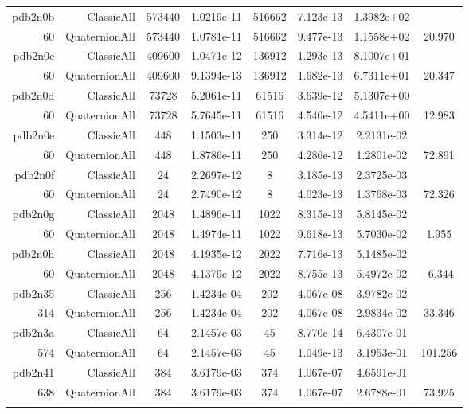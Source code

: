 \begin{xltabular}{\textwidth}{r|rcS[table-format=1.4e+2]cS[table-format=1.3e+2]S[table-format=1.4e+2]S[table-format=-1.3]}
pdb2n0b & ClassicAll & 573440 & 1.0219e-11 & 516662 & 7.123e-13 & 1.3982e+02 & \\
60 & QuaternionAll & 573440 & 1.0781e-11 & 516662 & 9.477e-13 & 1.1558e+02 & 20.970\\  \addlinespace
pdb2n0c & ClassicAll & 409600 & 1.0471e-12 & 136912 & 1.293e-13 & 8.1007e+01 & \\
60 & QuaternionAll & 409600 & 9.1394e-13 & 136912 & 1.682e-13 & 6.7311e+01 & 20.347\\  \addlinespace
pdb2n0d & ClassicAll & 73728 & 5.2061e-11 & 61516 & 3.639e-12 & 5.1307e+00 & \\
60 & QuaternionAll & 73728 & 5.7645e-11 & 61516 & 4.540e-12 & 4.5411e+00 & 12.983\\  \addlinespace
pdb2n0e & ClassicAll & 448 & 1.1503e-11 & 250 & 3.314e-12 & 2.2131e-02 & \\
60 & QuaternionAll & 448 & 1.8786e-11 & 250 & 4.286e-12 & 1.2801e-02 & 72.891\\  \addlinespace
pdb2n0f & ClassicAll & 24 & 2.2697e-12 & 8 & 3.185e-13 & 2.3725e-03 & \\
60 & QuaternionAll & 24 & 2.7490e-12 & 8 & 4.023e-13 & 1.3768e-03 & 72.326\\  \addlinespace
pdb2n0g & ClassicAll & 2048 & 1.4896e-11 & 1022 & 8.315e-13 & 5.8145e-02 & \\
60 & QuaternionAll & 2048 & 1.4974e-11 & 1022 & 9.618e-13 & 5.7030e-02 & 1.955\\  \addlinespace
pdb2n0h & ClassicAll & 2048 & 4.1935e-12 & 2022 & 7.716e-13 & 5.1485e-02 & \\
60 & QuaternionAll & 2048 & 4.1379e-12 & 2022 & 8.755e-13 & 5.4972e-02 & -6.344\\  \addlinespace
pdb2n35 & ClassicAll & 256 & 1.4234e-04 & 202 & 4.067e-08 & 3.9782e-02 & \\
314 & QuaternionAll & 256 & 1.4234e-04 & 202 & 4.067e-08 & 2.9834e-02 & 33.346\\  \addlinespace
pdb2n3a & ClassicAll & 64 & 2.1457e-03 & 45 & 8.770e-14 & 6.4307e-01 & \\
574 & QuaternionAll & 64 & 2.1457e-03 & 45 & 1.049e-13 & 3.1953e-01 & 101.256\\  \addlinespace
pdb2n41 & ClassicAll & 384 & 3.6179e-03 & 374 & 1.067e-07 & 4.6591e-01 & \\
638 & QuaternionAll & 384 & 3.6179e-03 & 374 & 1.067e-07 & 2.6788e-01 & 73.925\\  \addlinespace

\end{xltabular}
